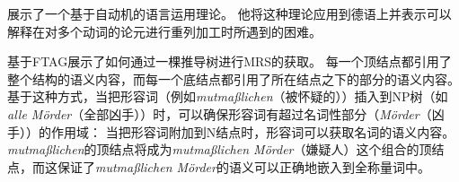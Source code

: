 \citet[Chapter~6]{Rambow94a}展示了一个基于自动机的语言运用理论。
他将这种理论应用到德语上并表示可以解释在对多个动词的论元进行重列加工时所遇到的困难。

\citet{KR2008a-u}基于FTAG展示了如何通过一棵推导树进行MRS的获取。
每一个顶结点都引用了整个结构的语义内容，而每一个底结点都引用了所在结点之下的部分的语义内容。
基于这种方式，当把形容词（例如\emph{mutmaßlichen}（被怀疑的））插入到NP树（如\emph{alle Mörder}（全部凶手））时，可以确保形容词有超过名词性部分（\emph{Mörder}（凶手））的作用域：
当把形容词附加到N结点时，形容词可以获取名词的语义内容。
\emph{mutmaßlichen}的顶结点将成为\emph{mutmaßlichen Mörder}（嫌疑人）这个组合的顶结点，而这保证了\emph{mutmaßlichen Mörder}的语义可以正确地嵌入到全称量词中。


